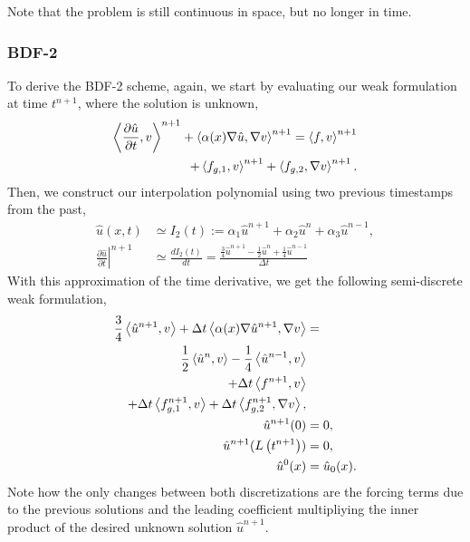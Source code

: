 \documentclass[../main.tex]{subfiles}
\newcommand{\inner}[2]{\left<#1, #2\right>}
\begin{document}
Note that the problem is still continuous in space, but no longer in time.

\subsubsection{BDF-2}
To derive the BDF-2 scheme, again, we start by evaluating our weak formulation at time $t^{n+1}$, where the solution is unknown,
\begin{equation}
    \begin{split}
        \inner{\frac{\partial \hat{u}}{\partial t}}{v}^{n+1} + \inner{\alpha(x) \grad \hat{u}}{\grad v}^{n+1} = \inner{f}{v}^{n+1} \\
        + \inner{f_{g,1}}{v}^{n+1} + \inner{f_{g,2}}{\grad v}^{n+1}.
    \end{split}
\end{equation}
Then, we construct our interpolation polynomial using two previous timestamps from the past, 
\begin{align}
    \hat{u}(x,t) &\simeq I_2(t) := 
      \alpha_1 \hat{u}^{n+1} 
    + \alpha_2 \hat{u}^{n}
    + \alpha_3 \hat{u}^{n-1}, \\
    \left.\frac{\partial\hat{u}}{\partial t}\right|^{n+1} &\simeq \frac{d I_2(t)}{dt} = 
    \frac{\frac{3}{4}\hat{u}^{n+1} - \frac{1}{2}\hat{u}^{n} + \frac{1}{4}\hat{u}^{n-1}}{\Delta t}
\end{align}
With this approximation of the time derivative, we get the following semi-discrete weak formulation, 
\begin{subequations}
    \begin{align}
        \label{eq:1d_fom_weak_formulation_semidiscrete_time_bdf2}
        \frac{3}{4}\inner{\hat{u}^{n+1}}{v} + \Delta t \inner{\alpha(x) \grad \hat{u}^{n+1}}{\grad v} &= \\
          \frac{1}{2}\inner{\hat{u}^{n}}{v}
        - \frac{1}{4}\inner{\hat{u}^{n-1}}{v} \nonumber \\
        + \Delta t \inner{f^{n+1}}{v} \nonumber \\
        + \Delta t \inner{f_{g,1}^{n+1}}{v} + \Delta t \inner{f_{g,2}^{n+1}}{\grad v}, \nonumber \\
        \hat{u}^{n+1}(0) &= 0, \\
        \hat{u}^{n+1}(L\left(t^{n+1}\right)) &= 0, \\
        \hat{u}^{0}(x) &= \hat{u}_0(x).
    \end{align}
\end{subequations}
Note how the only changes between both discretizations are the forcing terms due to the previous solutions and the leading coefficient multipliying the inner product of the desired unknown solution $\hat{u}^{n+1}$. 
\end{document}
